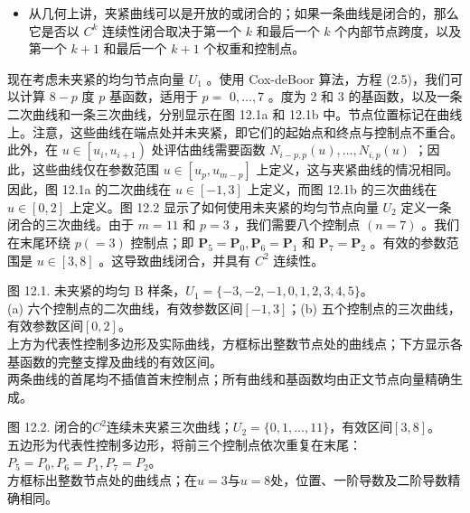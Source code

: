 \documentclass[../main.tex]{subfiles}
\begin{document}
\begin{itemize}
\item 从几何上讲，夹紧曲线可以是开放的或闭合的；如果一条曲线是闭合的，那么它是否以 \({C}^{k}\) 连续性闭合取决于第一个 \(k\) 和最后一个 \(k\) 个内部节点跨度，以及第一个 \(k + 1\) 和最后一个 \(k + 1\) 个权重和控制点。
\end{itemize}

现在考虑未夹紧的均匀节点向量 \({U}_{1}\) 。使用 Cox-deBoor 算法，方程 (2.5)，我们可以计算 \(8 - p\) 度 \(p\) 基函数，适用于 \(p =\)  \(0,\ldots ,7\) 。度为 2 和 3 的基函数，以及一条二次曲线和一条三次曲线，分别显示在图 12.1a 和 12.1b 中。节点位置标记在曲线上。注意，这些曲线在端点处并未夹紧，即它们的起始点和终点与控制点不重合。此外，在 \(u \in  \left\lbrack  {{u}_{i},{u}_{i + 1}}\right)\) 处评估曲线需要函数 \({N}_{i - p,p}\left( u\right) ,\ldots ,{N}_{i,p}\left( u\right)\) ；因此，这些曲线仅在参数范围 \(u \in  \left\lbrack  {{u}_{p},{u}_{m - p}}\right\rbrack\) 上定义，这与夹紧曲线的情况相同。因此，图 12.1a 的二次曲线在 \(u \in  \left\lbrack  {-1,3}\right\rbrack\) 上定义，而图 12.1b 的三次曲线在 \(u \in  \left\lbrack  {0,2}\right\rbrack\) 上定义。图 12.2 显示了如何使用未夹紧的均匀节点向量 \({U}_{2}\) 定义一条闭合的三次曲线。由于 \(m = {11}\) 和 \(p = 3\) ，我们需要八个控制点 \(\left( {n = 7}\right)\) 。我们在末尾环绕 \(p\left( { = 3}\right)\) 控制点；即 \({\mathbf{P}}_{5} = {\mathbf{P}}_{0},{\mathbf{P}}_{6} = {\mathbf{P}}_{1}\) 和 \({\mathbf{P}}_{7} = {\mathbf{P}}_{2}\) 。有效的参数范围是 \(u \in  \left\lbrack  {3,8}\right\rbrack\) 。这导致曲线闭合，并具有 \({C}^{2}\) 连续性。

\begin{center}
\begin{minipage}{37cm}
\centering
{}
\par\smallskip
图 12.1. 未夹紧的均匀 B 样条，$U_1=\{-3,-2,-1,0,1,2,3,4,5\}$。\\
(a) 六个控制点的二次曲线，有效参数区间$[-1,3]$；(b) 五个控制点的三次曲线，有效参数区间$[0,2]$。\\
上方为代表性控制多边形及实际曲线，方框标出整数节点处的曲线点；下方显示各基函数的完整支撑及曲线的有效区间。\\
两条曲线的首尾均不插值首末控制点；所有曲线和基函数均由正文节点向量精确生成。
\end{minipage}
\end{center}

\begin{center}
\begin{minipage}{26cm}
\centering
{}
\par\smallskip
图 12.2. 闭合的$C^2$连续未夹紧三次曲线；$U_2=\{0,1,\ldots,11\}$，有效区间$[3,8]$。\\
五边形为代表性控制多边形，将前三个控制点依次重复在末尾：$P_5=P_0,P_6=P_1,P_7=P_2$。\\
方框标出整数节点处的曲线点；在$u=3$与$u=8$处，位置、一阶导数及二阶导数精确相同。
\end{minipage}
\end{center}
\end{document}
